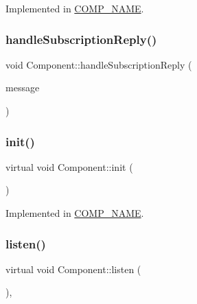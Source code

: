 Implemented in \hyperlink{classCOMP__NAME_a8c1d575e72e948f84891244ca3bee646}{C\+O\+M\+P\+\_\+\+N\+A\+ME}.

\mbox{\label{classComponent_af387d0bc27df38fc6c797d6d3329697a}} 
\subsubsection{\texorpdfstring{handle\+Subscription\+Reply()}{handleSubscriptionReply()}}
{\footnotesize\ttfamily void Component\+::handle\+Subscription\+Reply (\begin{DoxyParamCaption}\item[{\hyperlink{structSpaMessage}{Spa\+Message} $\ast$}]{message }\end{DoxyParamCaption})}

\mbox{\label{classComponent_a56baf8afdea3366554b3c7b13fd6e3f7}} 
\subsubsection{\texorpdfstring{init()}{init()}}
{\footnotesize\ttfamily virtual void Component\+::init (\begin{DoxyParamCaption}{ }\end{DoxyParamCaption})\hspace{0.3cm}{\ttfamily [pure virtual]}}



Implemented in \hyperlink{classCOMP__NAME_abfae2e6e6f24cee4c16800385a103ca8}{C\+O\+M\+P\+\_\+\+N\+A\+ME}.

\mbox{\label{classComponent_a2bbe062eb418a541fd0cfbcfdf3f55b0}} 
\subsubsection{\texorpdfstring{listen()}{listen()}}
{\footnotesize\ttfamily virtual void Component\+::listen (\begin{DoxyParamCaption}{ }\end{DoxyParamCaption})\hspace{0.3cm}{\ttfamily [inline]}, {\ttfamily [virtual]}}

